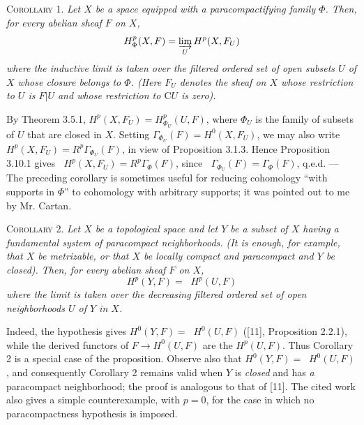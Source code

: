 

\textsc{Corollary 1.} \textit{Let $X$ be a space equipped with a
paracompactifying family $\Phi$. Then, for every abelian sheaf $F$ on $X$,}
\[
H^p_{\Phi}(X,F)=\varinjlim\limits_U H^p(X,F_U)
\]
\textit{where the inductive limit is taken over the filtered ordered set of
open subsets $U$ of $X$ whose closure belongs to $\Phi$. \textup{(}Here $F_U$ denotes
the sheaf on $X$ whose restriction to $U$ is $F|U$ and whose restriction to
$\mathrm C U$ is zero\textup{)}.}

By Theorem 3.5.1,
$H^p(X,F_U)=H^p_{\Phi_U}(U,F)$, where $\Phi_U$ is the family of subsets of
$U$ that are closed in $X$. Setting
$\Gamma_{\Phi_U}(F)=H^0(X,F_U)$, we may also write
$H^p(X,F_U)=R^p\Gamma_{\Phi_U}(F)$, in view of Proposition 3.1.3.
Hence Proposition 3.10.1 gives
$\mathop{\underset{\to}{\lim}} H^p(X,F_U)=R^p\Gamma_{\Phi}(F)$, since
$\mathop{\underset{\to}{\lim}}\Gamma_{\Phi_U}(F)=\Gamma_{\Phi}(F)$, q.e.d.
--- The preceding corollary is sometimes useful for reducing cohomology ``with
supports in $\Phi$'' to cohomology with arbitrary supports; it was pointed
out to me by Mr. Cartan.

\textsc{Corollary 2.} \textit{Let $X$ be a topological space and let
$Y$ be a subset of $X$ having a fundamental system of paracompact
neighborhoods. \textup{(}It is enough, for example, that $X$ be metrizable, or that $X$ be locally
compact and paracompact and $Y$ be closed\textup{)}. Then, for every abelian sheaf $F$ on $X$,}
\[
H^p(Y,F)=\mathop{\underset{\to}{\lim}} H^p(U,F)
\]
\textit{where the limit is taken over the decreasing filtered ordered set of
open neighborhoods $U$ of $Y$ in $X$.}

Indeed, the hypothesis gives
$H^0(Y,F)=\mathop{\underset{\to}{\lim}} H^0(U,F)$ ([11], Proposition 2.2.1), while the derived
functors of $F\to H^0(U,F)$ are the $H^p(U,F)$. Thus Corollary 2 is a
special case of the proposition. Observe also that
$H^0(Y,F)=\mathop{\underset{\to}{\lim}} H^0(U,F)$, and consequently Corollary 2 remains valid
when $Y$ is \textit{closed} and has \textit{a} paracompact neighborhood; the
proof is analogous to that of [11]. The cited work also gives a simple
counterexample, with $p=0$, for the case in which no paracompactness
hypothesis is imposed.

